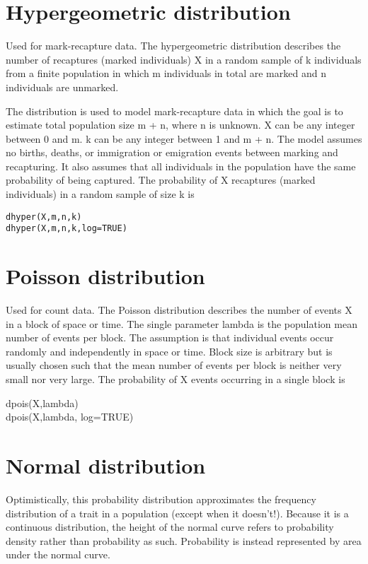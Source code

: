 \documentclass[12pt, a4paper]{article}
\theoremstyle{plain}
\theoremstyle{definition}
\theoremstyle{remark}
\begin{document}
\section{Hypergeometric distribution}
Used for mark-recapture data. The hypergeometric distribution describes the number of recaptures (marked individuals) X in a random sample of k individuals from a finite population in which m individuals in total are marked and n individuals are unmarked.

The distribution is used to model mark-recapture data in which the goal is to estimate total population size m + n, where n is unknown. X can be any integer between 0 and m. k can be any integer between 1 and m + n. The model assumes no births, deaths, or immigration or emigration events between marking and recapturing. It also assumes that all individuals in the population have the same probability of being captured. The probability of X recaptures (marked individuals) in a random sample of size k is
\begin{framed}
\begin{verbatim}
dhyper(X,m,n,k)
dhyper(X,m,n,k,log=TRUE)
\end{verbatim}
\end{framed}
\newpage
\section{Poisson distribution}
Used for count data. The Poisson distribution describes the number of events X in a block of space or time. The single parameter lambda is the population mean number of events per block. The assumption is that individual events occur randomly and independently in space or time. Block size is arbitrary but is usually chosen such that the mean number of events per block is neither very small nor very large. The probability of X events occurring in a single block is

dpois(X,lambda)\\
dpois(X,lambda, log=TRUE)
\section{Normal distribution}
Optimistically, this probability distribution approximates the frequency distribution of a trait in a population (except when it doesn't!). Because it is a continuous distribution, the height of the normal curve refers to probability density rather than probability as such. Probability is instead represented by area under the normal curve.
\end{document}
